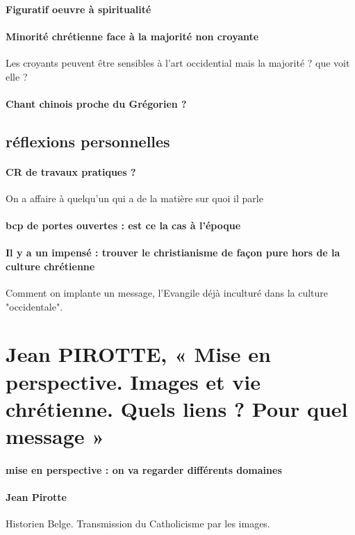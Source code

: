 \paragraph{Figuratif oeuvre à spiritualité}

\paragraph{Minorité chrétienne face à la majorité non croyante} Les croyants peuvent être sensibles à l'art occidential mais la majorité ? que voit elle ?

\paragraph{Chant chinois proche du Grégorien ?}

\subsection{réflexions personnelles}

\paragraph{CR de travaux pratiques ? } On a affaire à quelqu'un qui a de la matière sur quoi il parle
\paragraph{bcp de portes ouvertes  : est ce la cas à l'époque}


\paragraph{Il y a un impensé : trouver le christianisme de façon pure hors de la culture chrétienne } Comment on implante un message, l'Evangile déjà inculturé dans la culture "occidentale". 


\section{Jean PIROTTE, « Mise en perspective. Images et vie chrétienne. Quels liens ? Pour quel message »}

\paragraph{mise en perspective : on va regarder différents domaines}

\paragraph{Jean Pirotte} Historien Belge. 
Transmission du Catholicisme par les images.




